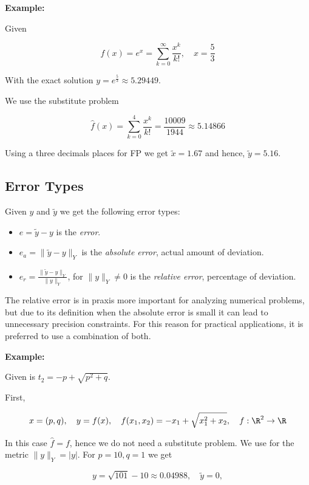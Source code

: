 \textbf{Example:}

Given 

\[
    f(x) = e^x = \sum_{k = 0}^{\infty} \frac{x^k}{k!}, \quad x = \frac{5}{3}
\]

With the exact solution \(y = e^\frac{5}{3} \approx 5.29449\). 

We use the substitute problem 

\[
    \hat{f}(x) = \sum_{k = 0}^{4} \frac{x^k}{k!} = \frac{10009}{1944} \approx 5.14866
\]

Using a three decimals places for FP we get \(\tilde{x} = 1.67\) and hence, \(\tilde{y} = 5.16\). 

\subsection{Error Types}

Given \(y\) and \(\tilde{y}\) we get the following error types:

\begin{itemize}

    \item \(e = \tilde{y} - y\) is the \emph{error}.

    \item \(e_a = \|\tilde{y} - y\|_Y\) is the \emph{absolute error}, actual amount of deviation.

    \item \(e_r = \frac{\|\tilde{y} - y\|_Y}{\|y\|_Y}\), for \(\|y\|_Y \ne 0\) is the \emph{relative error}, percentage of deviation.

\end{itemize}

The relative error is in praxis more important for analyzing numerical problems, but due to its definition when 
the absolute error is small it can lead to unnecessary precision constraints. For this reason 
for practical applications, it is preferred to use a combination of both.

\textbf{Example:}

Given is \(t_2 = -p + \sqrt{p^2 + q}\). 

First,

\[
    x = (p, q), \quad y = f(x), \quad f(x_1, x_2) = -x_1 + \sqrt{x_1^2 + x_2}, \quad f: \R^2 \to \R
\]

In this case \(\hat{f} = f\), hence we do not need a substitute problem. We use for the metric \(\|y\|_Y = |y|\). 
For \(p = 10, q = 1\) we get  

\[
    y = \sqrt{101} - 10 \approx 0.04988, \quad \tilde{y} = 0,
\]

